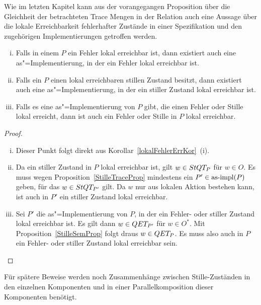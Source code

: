 Wie im letzten Kapitel kann aus der vorangegangen Proposition über die
Gleichheit der betrachteten Trace Mengen in der Relation \QRel{} auch eine
Aussage über die lokale Erreichbarkeit \glqq fehlerhafter Zustände\grqq{} in
einer Spezifikation und den zugehörigen Implementierungen getroffen werden.

\begin{Kor}\mbox{}
  \label{lokaleStilleErrKor}
  \begin{enumerate}[(i)]
    \item Falls in einem \MEIO{} $P$ ein Fehler lokal erreichbar ist, dann
      existiert auch eine as"=Implementierung, in der ein Fehler lokal
      erreichbar ist.
    \item Falls ein \MEIO{} $P$ einen lokal erreichbaren stillen Zustand
      besitzt, dann existiert auch eine as"=Implementierung, in der ein
      stiller Zustand lokal erreichbar ist.
    \item Falls es eine as"=Implementierung von $P$ gibt, die einen Fehler oder
      Stille lokal erreicht, dann ist auch ein Fehler oder Stille in $P$ lokal
      erreichbar.
  \end{enumerate}
\end{Kor}
\begin{proof}\mbox{}
  \begin{enumerate}[(i)]
    \item Dieser Punkt folgt direkt aus Korollar~\ref{lokalFehlerErrKor}~(i).
    \item Da ein stiller Zustand in $P$ lokal erreichbar ist, gilt $w\in StQT
      _P$ für $w\in O$. Es muss wegen Proposition~\ref{StilleTraceProp}
      mindestens ein $P'\in \mathrm{as}\text{-}\mathrm{impl} (P)$ geben, für das $w\in StQT _{P'}$
      gilt. Da $w$ nur aus lokalen Aktion bestehen kann, ist auch in $P'$ ein
      stiller Zustand lokal erreichbar.
    \item Sei $P'$ die as"=Implementierung von $P$, in der ein Fehler- oder
      stiller Zustand lokal erreichbar ist. Es gilt dann $w\in QET _{P'}$ für
      $w\in O^*$. Mit Proposition~\ref{StilleSemProp} folgt draus $w\in QET _P$.
      Es muss also auch in $P$ ein Fehler- oder stiller Zustand lokal
      erreichbar sein.
  \end{enumerate}
\end{proof}

Für spätere Beweise werden noch Zusammenhänge zwischen Stille-Zuständen in den
einzelnen Komponenten und in einer Parallelkomposition dieser Komponenten
benötigt.

